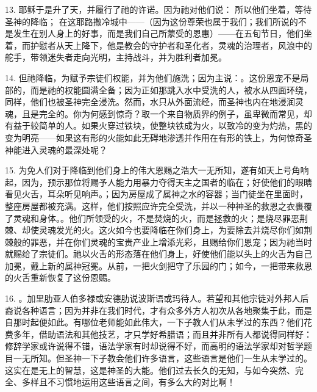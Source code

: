 13. 耶稣于是升了天，并履行了祂的许诺。因为祂对他们说： 所以他们坐着，等待圣神的降临； 在这耶路撒冷城中——（因为这份尊荣也属于我们；我们所说的不是发生在别人身上的好事，而是我们自己所蒙受的恩惠）——在五旬节日，他们坐着，而护慰者从天上降下，他是教会的守护者和圣化者，灵魂的治理者，风浪中的舵手，带领迷失者走向光明，主持战斗，并为胜利者加冕。\par

14. 但祂降临，为赋予宗徒们权能，并为他们施洗；因为主说：。这份恩宠不是局部的，而是祂的权能圆满全备；因为正如那跳入水中受洗的人，被水从四面环绕，同样，他们也被圣神完全浸洗。然而，水只从外面流经，而圣神也内在地浸润灵魂，且是完全的。你为何感到惊奇？取一个来自物质界的例子，虽卑微而常见，却有益于较简单的人。如果火穿过铁块，使整块铁成为火，以致冷的变为灼热，黑的变为明亮——如果这有形的火能如此无碍地渗透并作用在有形的铁上，为何惊奇圣神能进入灵魂的最深处呢？\par

15. 为免人们对于降临到他们身上的伟大恩赐之浩大一无所知，遂有如天上号角响起，因为，预示那位将赐予人能力用暴力夺得天主之国者的临在；好使他们的眼睛看见火舌，耳朵听见响声。；因为房屋成了属神之水的容器；当门徒坐在里面时，整座房屋都被充满。这样，他们按照应许完全受洗，并以一种神圣的救恩之衣裹覆了灵魂和身体。。他们所领受的火，不是焚烧的火，而是拯救的火；是烧尽罪恶荆棘、却使灵魂发光的火。这火如今也要降临在你们身上，为要除去并烧尽你们如荆棘般的罪恶，并在你们灵魂的宝贵产业上增添光彩，且赐给你们恩宠；因为祂当时就赐给了宗徒们。祂以火舌的形态落在他们身上，好使他们能以头上的火舌为自己加冕，戴上新的属神冠冕。从前，一把火剑把守了乐园的门；如今，一把带来救恩的火舌重新恢复了这份恩赐。\par

16. 。加里肋亚人伯多禄或安德肋说波斯语或玛待人。若望和其他宗徒对外邦人后裔说各种语言；因为并非在我们时代，才有众多外方人初次从各地聚集于此，而是自那时起便如此。有哪位老师能如此伟大，一下子教人们从未学过的东西？他们花费多年，借助语法和其他技艺，才只学好希腊语；而且并非所有人都说得同样好：修辞学家或许说得不错，语法学家有时却说得不好，而高明的语法学家却对哲学题目一无所知。但圣神一下子教会他们许多语言，这些语言是他们一生从未学过的。这实在是无上的智慧，这是神圣的大能。他们过去长久的无知，与如今突然、完全、多样且不习惯地运用这些语言之间，有多么大的对比啊！\par

